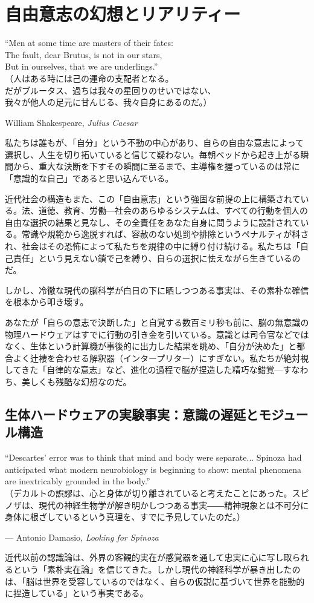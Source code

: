 \chapter{自由意志の幻想とリアリティー}
\epigraph{``Men at some time are masters of their fates:\\
The fault, dear Brutus, is not in our stars,\\
But in ourselves, that we are underlings.''\\
\small（人はある時には己の運命の支配者となる。\\
だがブルータス、過ちは我々の星回りのせいではない、\\
我々が他人の足元に甘んじる、我々自身にあるのだ。）}{William Shakespeare, \textit{Julius Caesar}}
私たちは誰もが、「自分」という不動の中心があり、自らの自由な意志によって選択し、人生を切り拓いていると信じて疑わない。毎朝ベッドから起き上がる瞬間から、重大な決断を下すその瞬間に至るまで、主導権を握っているのは常に「意識的な自己」であると思い込んでいる。

近代社会の構造もまた、この「自由意志」という強固な前提の上に構築されている。法、道徳、教育、労働—社会のあらゆるシステムは、すべての行動を個人の自由な選択の結果と見なし、その全責任をあなた自身に問うように設計されている。常識や規範から逸脱すれば、容赦のない処罰や排除というペナルティが科され、社会はその恐怖によって私たちを規律の中に縛り付け続ける。私たちは「自己責任」という見えない鎖で己を縛り、自らの選択に怯えながら生きているのだ。

しかし、冷徹な現代の脳科学が白日の下に晒しつつある事実は、その素朴な確信を根本から叩き壊す。

あなたが「自らの意志で決断した」と自覚する数百ミリ秒も前に、脳の無意識の物理ハードウェアはすでに行動の引き金を引いている。意識とは司令官などではなく、生体という計算機が事後的に出力した結果を眺め、「自分が決めた」と都合よく辻褄を合わせる解釈器（インタープリター）にすぎない。私たちが絶対視してきた「自律的な意志」など、進化の過程で脳が捏造した精巧な錯覚—すなわち、美しくも残酷な幻想なのだ。

\section{生体ハードウェアの実験事実：意識の遅延とモジュール構造}
\epigraph{``Descartes’ error was to think that mind and body were separate... Spinoza had anticipated what modern neurobiology is beginning to show: mental phenomena are inextricably grounded in the body.''\\
（デカルトの誤謬は、心と身体が切り離されていると考えたことにあった。スピノザは、現代の神経生物学が解き明かしつつある事実――精神現象とは不可分に身体に根ざしているという真理を、すでに予見していたのだ。）}{--- Antonio Damasio, \textit{Looking for Spinoza}}
近代以前の認識論は、外界の客観的実在が感覚器を通して忠実に心に写し取られるという「素朴実在論」を信じてきた。しかし現代の神経科学が暴き出したのは、「脳は世界を受容しているのではなく、自らの仮説に基づいて世界を能動的に捏造している」という事実である。

